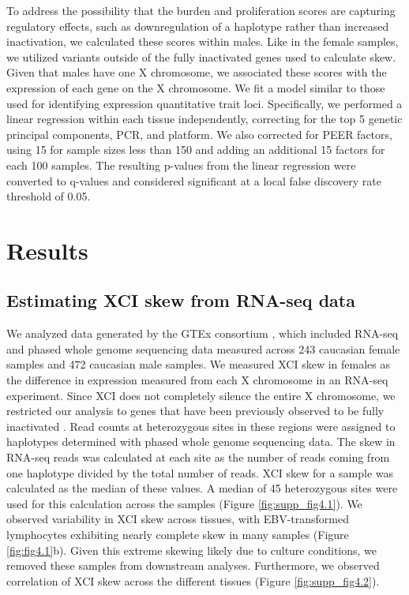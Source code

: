 To address the possibility that the burden and proliferation scores are capturing regulatory effects, such as downregulation of a haplotype rather than increased inactivation, we calculated these scores within males. Like in the female samples, we utilized variants outside of the fully inactivated genes used to calculate skew. Given that males have one X chromosome, we associated these scores with the expression of each gene on the X chromosome. We fit a model similar to those used for identifying expression quantitative trait loci. Specifically, we performed a linear regression within each tissue independently, correcting for the top 5 genetic principal components, PCR, and platform. We also corrected for PEER factors, \cite{Stegle2012-uf} using 15 for sample sizes less than 150 and adding an additional 15 factors for each 100 samples. The resulting p-values from the linear regression were converted to q-values \cite{Storey2003-kx} and considered significant at a local false discovery rate threshold of 0.05. 

\section{Results}

\subsection{Estimating XCI skew from RNA-seq data}

We analyzed data generated by the GTEx consortium \cite{GTEx_Consortium2020-xx}, which included RNA-seq and phased whole genome sequencing data measured across 243 caucasian female samples and 472 caucasian male samples. We measured XCI skew in females as the difference in expression measured from each X chromosome in an RNA-seq experiment. Since XCI does not completely silence the entire X chromosome, we restricted our analysis to genes that have been previously observed to be fully inactivated \cite{Carrel2005-zm,Cotton2013-jl,Tukiainen2017-xm}. Read counts at heterozygous sites in these regions were assigned to haplotypes determined with phased whole genome sequencing data. The skew in RNA-seq reads was calculated at each site as the number of reads coming from one haplotype divided by the total number of reads. XCI skew for a sample was calculated as the median of these values. A median of 45 heterozygous sites were used for this calculation across the samples (Figure \ref{fig:supp_fig4.1}). We observed variability in XCI skew across tissues, with EBV-transformed lymphocytes exhibiting nearly complete skew in many samples (Figure \ref{fig:fig4.1}b).  Given this extreme skewing likely due to culture conditions, we removed these samples from downstream analyses. Furthermore, we observed correlation of XCI skew across the different tissues (Figure \ref{fig:supp_fig4.2}).

